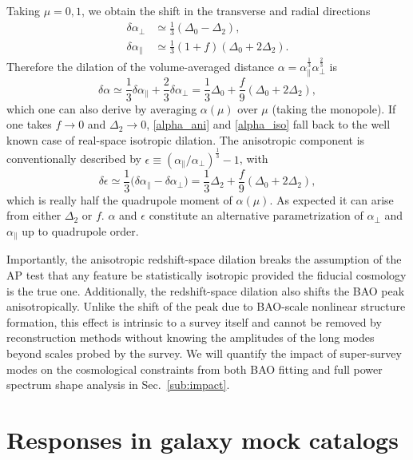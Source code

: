 \documentclass[a4paper,11pt]{article}
\begin{document}
Taking $\mu=0,1$, we obtain the shift in the transverse and radial directions
\begin{align}
    \delta\alpha_\perp &\simeq \frac13 (\Delta_0 - \Delta_2), \nonumber\\
    \delta\alpha_\parallel &\simeq \frac13 (1+f) (\Delta_0 + 2\Delta_2).
    \label{alpha_ani}
\end{align}
Therefore the dilation of the volume-averaged distance $\alpha =
\alpha_\parallel^\frac13 \alpha_\perp^\frac23$ is
\begin{equation}
    \delta\alpha
    \simeq \frac13\delta\alpha_\parallel + \frac23\delta\alpha_\perp
    = \frac13\Delta_0 + \frac{f}9 (\Delta_0 + 2\Delta_2),
    \label{alpha_iso}
\end{equation}
which one can also derive by averaging $\alpha(\mu)$ over $\mu$ (taking the
monopole).
If one takes $f\to0$ and $\Delta_2\to0$, \eqref{alpha_ani} and
\eqref{alpha_iso} fall back to the well known case of real-space isotropic
dilation.
The anisotropic component is conventionally described by $\epsilon \equiv
(\alpha_\parallel/\alpha_\perp)^\frac13 - 1$, with
\begin{equation}
    \delta\epsilon
    \simeq \frac13\bigl(\delta\alpha_\parallel-\delta\alpha_\perp\bigr)
    = \frac13\Delta_2 + \frac{f}9 (\Delta_0+2\Delta_2),
    \label{epsilon}
\end{equation}
which is really half the quadrupole moment of $\alpha(\mu)$.
As expected it can arise from either $\Delta_2$ or $f$.
$\alpha$ and $\epsilon$ constitute an alternative parametrization of
$\alpha_\perp$ and $\alpha_\parallel$ up to quadrupole order.

Importantly, the anisotropic redshift-space dilation
 breaks the assumption of the AP
test that any feature be
statistically isotropic provided the fiducial cosmology is the true one.
Additionally, the redshift-space dilation also shifts the BAO peak
anisotropically.
Unlike the shift of the peak due to BAO-scale nonlinear structure formation,
this effect is intrinsic to a survey itself and cannot be removed by
reconstruction methods without knowing the amplitudes of the long modes beyond
scales probed by the survey.
We will quantify the impact of super-survey modes on the cosmological
constraints from both BAO fitting and full power spectrum shape analysis in
Sec.~\ref{sub:impact}.



\section{Responses in galaxy mock catalogs}
\label{sec:mock}
\end{document}

